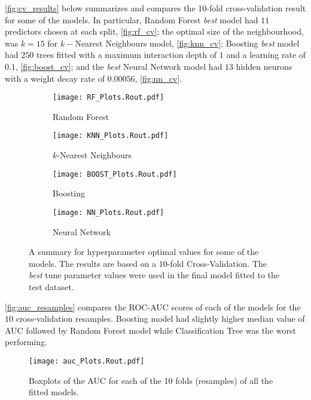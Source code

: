 \clearpage
\noindent \autoref{fig:cv_results} below summarizes and compares the 10-fold cross-validation result for some of the models. In particular, Random Forest \textit{best} model had $11$ predictors chosen at each split, \autoref{fig:rf_cv}; the optimal size of the neighbourhood, was $k = 15$ for $k-$Nearest Neighbours model, \autoref{fig:knn_cv}; Boosting \textit{best} model had $250$ trees fitted with a maximum interaction depth of $1$ and a learning rate of $0.1$, \autoref{fig:boost_cv}; and the \textit{best} Neural Network model had $13$ hidden neurons with a weight decay rate of $0.00056$, \autoref{fig:nn_cv}.
\noindent\begin{figure}[H]
    \centering
    \begin{subfigure}[b]{0.4\textwidth}
        \texttt{[image: RF\_Plots.Rout.pdf]}
        \caption{\small{Random Forest}}\label{fig:rf_cv}
    \end{subfigure}
    \begin{subfigure}[b]{0.4\textwidth}
        \texttt{[image: KNN\_Plots.Rout.pdf]}
        \caption{\small{$k$-Nearest Neighbours}}\label{fig:knn_cv}
    \end{subfigure}
    \begin{subfigure}[b]{0.4\textwidth}
        \texttt{[image: BOOST\_Plots.Rout.pdf]}
        \caption{\small{Boosting}}\label{fig:boost_cv}
    \end{subfigure}
    \begin{subfigure}[b]{0.4\textwidth}
        \texttt{[image: NN\_Plots.Rout.pdf]}
        \caption{\small{Neural Network}}\label{fig:nn_cv}
    \end{subfigure}
    \caption{{A summary for hyperparameter optimal values for some of the models. The results are based on a $10$-fold Cross-Validation. The \textit{best} tune parameter values were used in the final model fitted to the test dataset.}}\label{fig:cv_results}
\end{figure}
\clearpage
\noindent \autoref{fig:auc_resamples} compares the ROC-AUC scores of each of the models for the $10$ cross-validation resamples. Boosting model had slightly higher median value of AUC followed by Random Forest model while Classification Tree was the worst performing.
\noindent\begin{figure}[H]
    \centering
    \texttt{[image: auc\_Plots.Rout.pdf]}\vspace{-0.3cm}
    \caption{\small{Boxplots of the AUC for each of the 10 folds (resamples) of all the fitted models.}}\label{fig:auc_resamples}
\end{figure}
